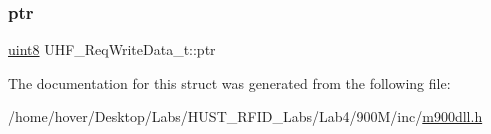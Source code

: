 \mbox{\label{struct_u_h_f___req_write_data__t_a9da7e2da4c8df6ab2ca509e199a53e5a}} 
\subsubsection{\texorpdfstring{ptr}{ptr}}
{\footnotesize\ttfamily \mbox{\hyperlink{m900dll_8h_adde6aaee8457bee49c2a92621fe22b79}{uint8}} U\+H\+F\+\_\+\+Req\+Write\+Data\+\_\+t\+::ptr}



The documentation for this struct was generated from the following file\+:\begin{DoxyCompactItemize}
\item 
/home/hover/\+Desktop/\+Labs/\+H\+U\+S\+T\+\_\+\+R\+F\+I\+D\+\_\+\+Labs/\+Lab4/900\+M/inc/\mbox{\hyperlink{m900dll_8h}{m900dll.\+h}}\end{DoxyCompactItemize}
